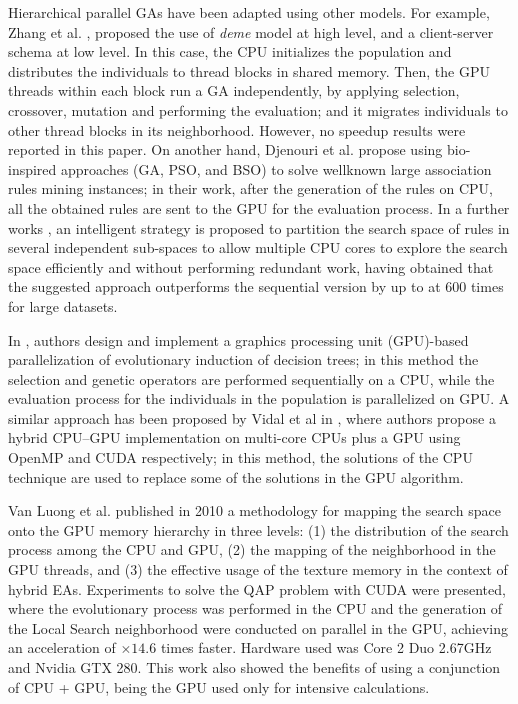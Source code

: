 \documentclass{article}
\begin{document}
Hierarchical parallel GAs have been adapted using other models. 
For example, Zhang et al. \cite{ZhangImplementationserverClient},
proposed the use of {\em deme} model at high level, and a
client-server schema at low level. In this case, the CPU initializes
the population and distributes the individuals to thread blocks in
shared memory. Then, the GPU threads within each block run a GA
independently, by applying selection, crossover, mutation and
performing the evaluation; and it migrates individuals to other thread
blocks in its neighborhood. However, no speedup results were reported
in this paper. 
On another hand, Djenouri et al. \cite{Djenouri2017a} propose using bio-inspired approaches (GA, PSO, and BSO) to solve wellknown large association rules mining instances; in their work, after the generation of the rules on CPU, all the obtained rules are sent to the GPU for the evaluation process. In a further works \cite{Djenouri2017b,DJENOURI2018}, an intelligent strategy is proposed to partition the search space of rules in several independent sub-spaces to allow multiple CPU cores to explore the search space efficiently and without performing redundant work, having obtained that the suggested approach outperforms the sequential version by up to at 600 times for large datasets. 

In \cite{Jurczuk2017}, authors design and implement a graphics processing unit (GPU)-based parallelization of evolutionary induction of decision trees; in this method the selection and genetic operators are performed sequentially on a CPU, while the evaluation process for the individuals in the population is parallelized on GPU.
A similar approach has been proposed by Vidal et al in
\cite{Vidal2017}, where authors propose a hybrid CPU--GPU
implementation on multi-core CPUs plus a GPU using OpenMP and CUDA
respectively; in this method, the solutions of the CPU technique are
used to replace some of the solutions in the GPU algorithm.

Van Luong et al. \cite{5586403} published in 2010 a methodology for mapping the search space onto the GPU memory hierarchy in three levels: (1) the distribution of the search process among the CPU and GPU, (2) the mapping of the neighborhood in the GPU threads, and (3) the effective usage of the texture memory in the context of hybrid EAs. Experiments to solve the QAP problem with CUDA were presented, where the evolutionary process was performed in the CPU and the generation of the Local Search neighborhood were conducted on parallel in the GPU, achieving an acceleration of $\times14.6$ times faster. Hardware used was Core 2 Duo 2.67GHz and Nvidia GTX 280. This work also showed the benefits of using a conjunction of CPU + GPU, being the GPU used only for intensive calculations.
\end{document}

